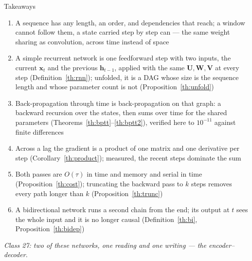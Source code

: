 \documentclass[aspectratio=169, 11pt]{beamer}
\newcommand{\bridge}[1]{%
  {\scriptsize\itshape\color{mcMuted} #1\par}\vspace{0.35em}}
\newcommand{\nosrc}{}       %
\begin{document}
\begin{frame}{Takeaways}
  \nosrc
  \vspace{-0.1em}
  {\scriptsize
  \begin{enumerate}\itemsep0.24em
    \item A sequence has any length, an order, and dependencies that
          reach; a window cannot follow them, a state carried step by step
          can --- the same weight sharing as convolution, across time
          instead of space
    \item A simple recurrent network is one feedforward step with two
          inputs, the current $\mathbf{x}_t$ and the previous $\mathbf{h}_{t-1}$,
          applied with the same $\mathbf{U}, \mathbf{W}, \mathbf{V}$ at every
          step (Definition~\ref{th:rnn}); unfolded, it is a DAG whose size
          is the sequence length and whose parameter count is not
          (Proposition~\ref{th:unfold})
    \item Back-propagation through time is back-propagation on that
          graph: a backward recursion over the states, then sums over time
          for the shared parameters (Theorems~\ref{th:bptt}--\ref{th:bptt2}),
          verified here to $10^{-11}$ against finite differences
    \item Across a lag the gradient is a product of one matrix and one
          derivative per step (Corollary~\ref{th:product}); measured, the
          recent steps dominate the sum
    \item Both passes are $O(\tau)$ in time and memory and serial in time
          (Proposition~\ref{th:cost}); truncating the backward pass to $k$
          steps removes every path longer than $k$
          (Proposition~\ref{th:trunc})
    \item A bidirectional network runs a second chain from the end; its
          output at $t$ sees the whole input and it is no longer causal
          (Definition~\ref{th:bi}, Proposition~\ref{th:bidep})
  \end{enumerate}}
  \vspace{-0.2em}
  \bridge{Class 27: two of these networks, one reading and one writing --- the encoder--decoder.}
\end{frame}
\end{document}
